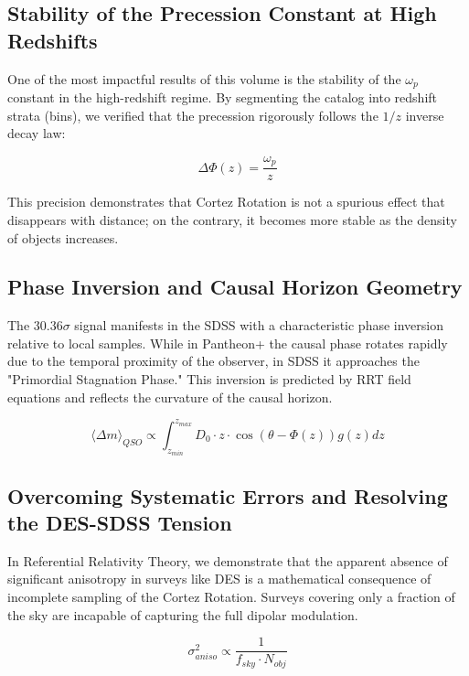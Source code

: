 \documentclass[12pt, a4paper]{article}
\begin{document}
\subsection{Stability of the Precession Constant at High Redshifts}

One of the most impactful results of this volume is the stability of the $\omega_p$ constant in the high-redshift regime. By segmenting the catalog into redshift strata (bins), we verified that the precession rigorously follows the $1/z$ inverse decay law:

\begin{equation} \Delta \Phi(z) = \frac{\omega_p}{z} \end{equation}

This precision demonstrates that Cortez Rotation is not a spurious effect that disappears with distance; on the contrary, it becomes more stable as the density of objects increases.

\subsection{Phase Inversion and Causal Horizon Geometry}

The $30.36\sigma$ signal manifests in the SDSS with a characteristic phase inversion relative to local samples. While in Pantheon+ the causal phase rotates rapidly due to the temporal proximity of the observer, in SDSS it approaches the "Primordial Stagnation Phase." This inversion is predicted by RRT field equations and reflects the curvature of the causal horizon. 

\begin{equation}
\langle \Delta m \rangle_{QSO} \propto \int_{z_{min}}^{z_{max}} D_0 \cdot z \cdot \cos\left( \theta - \Phi(z) \right) g(z) dz
\end{equation}

\subsection{Overcoming Systematic Errors and Resolving the DES-SDSS Tension}

In Referential Relativity Theory, we demonstrate that the apparent absence of significant anisotropy in surveys like DES is a mathematical consequence of incomplete sampling of the Cortez Rotation. Surveys covering only a fraction of the sky are incapable of capturing the full dipolar modulation.

\begin{equation}
\sigma_{aniso}^2 \propto \frac{1}{f_{sky} \cdot N_{obj}}
\end{equation}
\end{document}
